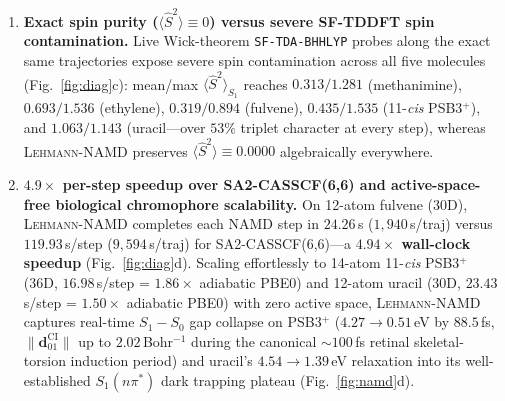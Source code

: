\documentclass[10pt,twocolumn]{article}
\theoremstyle{natthm}
\newcommand{\leh}{\textsc{Lehmann-NAMD}}
\newcommand{\Ssq}{\langle\hat{S}^2\rangle}
\newcommand{\dCI}{\mathbf{d}_{01}^{\mathrm{CI}}}
\begin{document}
\begin{enumerate}
  \item \textbf{Exact spin purity ($\Ssq\equiv 0$) versus severe SF-TDDFT spin contamination.} Live Wick-theorem \texttt{SF-TDA-BHHLYP} probes along the exact same trajectories expose severe spin contamination across all five molecules (Fig.~\ref{fig:diag}c): mean/max $\Ssq_{S_1}$ reaches $0.313/1.281$ (methanimine), $0.693/1.536$ (ethylene), $0.319/0.894$ (fulvene), $0.435/1.535$ (11-\emph{cis} PSB3$^+$), and $1.063/1.143$ (uracil---over $53\%$ triplet character at every step), whereas \leh{} preserves $\Ssq\equiv 0.0000$ algebraically everywhere.
  \item \textbf{$4.9\times$ per-step speedup over SA2-CASSCF(6,6) and active-space-free biological chromophore scalability.} On 12-atom fulvene (30D), \leh{} completes each NAMD step in $24.26$\,s ($1{,}940$\,s/traj) versus $119.93$\,s/step ($9{,}594$\,s/traj) for SA2-CASSCF(6,6)---a \textbf{$4.94\times$ wall-clock speedup} (Fig.~\ref{fig:diag}d). Scaling effortlessly to 14-atom 11-\emph{cis} PSB3$^+$ (36D, $16.98$\,s/step = $1.86\times$ adiabatic PBE0) and 12-atom uracil (30D, $23.43$\,s/step = $1.50\times$ adiabatic PBE0) with zero active space, \leh{} captures real-time $S_1-S_0$ gap collapse on PSB3$^+$ ($4.27\to 0.51$\,eV by $88.5$\,fs, $\|\dCI\|$ up to $2.02$\,Bohr$^{-1}$ during the canonical $\sim 100$\,fs retinal skeletal-torsion induction period\cite{gozem2014psb3}) and uracil's $4.54\to 1.39$\,eV relaxation into its well-established $S_1(n\pi^*)$ dark trapping plateau\cite{hudock2007uracil} (Fig.~\ref{fig:namd}d).
\end{enumerate}
\end{document}
